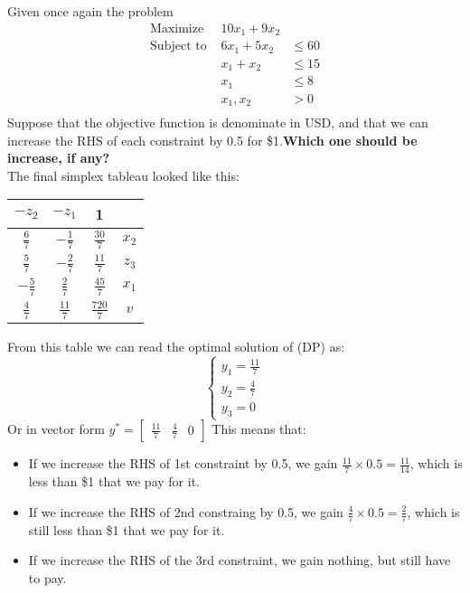 \ex{}
{
    Given once again the problem
    \begin{equation}
        \begin{aligned}
            \text{Maximize}&10x_1+9x_2&\mbox{}\\[1.25ex]
            \text{Subject to }&6x_1+5x_2&\le 60\mbox{}\\[1.25ex]
            &x_1+x_2&\le 15\mbox{}\\[1.25ex]
            &x_1&\le 8\mbox{}\\[1.25ex]
            &x_1,x_2&>0\mbox{}\\[1.25ex]
        \end{aligned}
    \end{equation}
    Suppose that the objective function is denominate in USD, and that we can increase the RHS of each constraint by 0.5 for \$1.\textbf{Which one should be increase, if any?}
\\
The final simplex tableau looked like this:
    \begin{center}
    \begin{tabular}{|cc|c|c|}
    \hline
    $-z_2$ & $-z_1$ & 1 & \\
    \hline
    $\frac{6}{7}$& $-\frac{1}{7}$ & $\frac{30}{7}$ &$x_2$ \\
    $\frac{5}{7}$& $-\frac{2}{7}$ &$ \frac{11}{7}$ & $z_3$ \\
    $-\frac{5}{7}$&$ \frac{2}{7} $&$ \frac{45}{7}$ & $x_1$ \\
    \hline
    $\frac{4}{7}$ &$ \frac{11}{7} $& $\frac{720}{7}$ &$v $\\
    \hline
    \end{tabular}
    \end{center}
    From this table we can read the optimal solution of (DP) as:
    \begin{equation}
        \begin{cases}
            y_1 = \frac{11}{7}\\
            y_2 = \frac{4}{7}\\
            y_3 = 0
        \end{cases}
    \end{equation}
    Or in vector form $y^{*} = \begin{bmatrix}
        \frac{11}{7} & \frac{4}{7} & 0 
    \end{bmatrix}$
This means that:
\begin{itemize}
    \item If we increase the RHS of 1st constraint by 0.5, we gain $\frac{11}{7}\times 0.5 = \frac{11}{14}$, which is less than \$1 that we pay for it.
    \item If we increase the RHS of 2nd constraing by 0.5, we gain $\frac{4}{7}\times 0.5 = \frac{2}{7}$, which is still less than \$1 that we pay for it.
    \item If we increase the RHS of the 3rd constraint, we gain nothing, but still have to pay.
\end{itemize}
}

